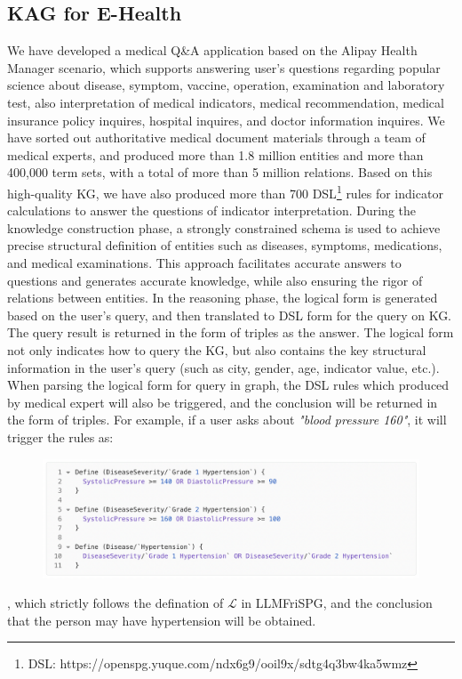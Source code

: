 \documentclass{article}
\begin{document}
\subsection{KAG for E-Health}
We have developed a medical Q\&A application based on the Alipay Health Manager scenario, which supports answering user's questions regarding popular science about disease, symptom, vaccine, operation, examination and laboratory test, also interpretation of medical indicators, medical recommendation, medical insurance policy inquires, hospital inquires, and doctor information inquires. We have sorted out authoritative medical document materials through a team of medical experts, and produced more than 1.8 million entities and more than 400,000 term sets, with a total of more than 5 million relations. Based on this high-quality KG, we have also produced more than 700 DSL\footnote{DSL: https://openspg.yuque.com/ndx6g9/ooil9x/sdtg4q3bw4ka5wmz} rules for indicator calculations to answer the questions of indicator interpretation.\newline \newline
During the knowledge construction phase, a strongly constrained schema is used to achieve precise structural definition of entities such as diseases, symptoms, medications, and medical examinations. This approach facilitates accurate answers to questions and generates accurate knowledge, while also ensuring the rigor of relations between entities. 
In the reasoning phase, the logical form is generated based on the user's query, and then translated to DSL form for the query on KG. The query result is returned in the form of triples as the answer.
The logical form not only indicates how to query the KG, but also contains the key structural information in the user’s query (such as city, gender, age, indicator value, etc.). When parsing the logical form for query in graph, the DSL rules which produced by medical expert will also be triggered, and the conclusion will be returned in the form of triples. For example, if a user asks about \textit{"blood pressure 160"}, it will trigger the rules as:\begin{figure}[H]
    \raggedright
    \includegraphics[width=0.7\linewidth]{figures/hypertension_diagnosis.png}
\end{figure}    
, which strictly follows the defination of $\mathcal{L}$ in LLMFriSPG, and the conclusion that the person may have hypertension will be obtained.
\end{document}
